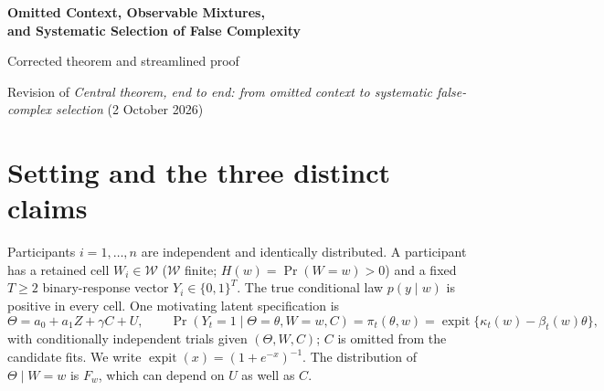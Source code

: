 \documentclass[11pt,letterpaper]{article}
\theoremstyle{plain}
\theoremstyle{definition}
\newcommand{\sig}{\operatorname{expit}}
\begin{document}
\begin{center}
{\Large\bfseries\color{navy} Omitted Context, Observable Mixtures,\\ and Systematic Selection of False Complexity}\par
\vspace{6pt}
{\large Corrected theorem and streamlined proof}\par
\vspace{4pt}
{\small Revision of \emph{Central theorem, end to end: from omitted context to systematic false-complex selection} (2 October 2026)}
\end{center}
\vspace{5pt}
\begin{abstract}
\noindent We prove first, by an exact two-trial construction, that omitted context can make a homogeneous complex cognitive model strictly closer in joint Kullback--Leibler (KL) divergence to the observed data than a nested homogeneous simple model, even though both models are false. We then give a short general sufficient condition: a nonzero population extra-parameter score at the simple-model KL projection. With fixed numbers of trials and finite design support, BIC, Bayes factors and exact trial-level Bayesian leave-one-out (LOO) select the false complex model with probability tending to one. A separate local weighted-projection formula explains which design signatures generate the effect. The hierarchical extension is \emph{conditional}: positive joint and conditional KL advantages must be established independently, and the regular local projection calculation requires interior, identifiable observable-law geometry. Zero-variance random-effects boundaries are not covered by that calculation. Relative to the initial draft, this version makes the closure formulation part of the definition of the risks and corrects score-drift, tangent-absorption, moment, parity and context-comparator overstatements; it also incorporates the fixes of an independent audit (29 October 2026).
\end{abstract}

\section{Setting and the three distinct claims}
Participants $i=1,\ldots,n$ are independent and identically distributed. A participant has a retained cell $W_i\in\mathcal W$ ($\mathcal W$ finite; $H(w)=\Pr(W=w)>0$) and a fixed $T\ge2$ binary-response vector $Y_i\in\{0,1\}^T$. The true conditional law $p(y\mid w)$ is positive in every cell. One motivating latent specification is
\begin{equation}\label{eq:latent}
\Theta=a_0+a_1Z+\gamma C+U,\qquad
\Pr(Y_t=1\mid\Theta=\theta,W=w,C)=\pi_t(\theta,w)=\sig\{\kappa_t(w)-\beta_t(w)\theta\},
\end{equation}
with conditionally independent trials given $(\Theta,W,C)$; $C$ is omitted from the candidate fits. We write $\sig(x)=(1+e^{-x})^{-1}$. The distribution of $\Theta\mid W=w$ is $F_w$, which can depend on $U$ as well as $C$.
\end{document}
